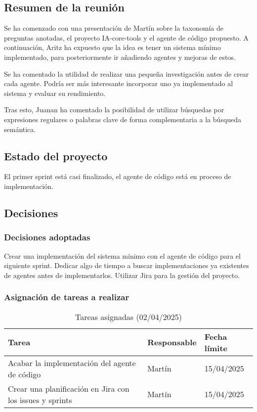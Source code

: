 \subsection{Resumen de la reunión}
Se ha comenzado con una presentación de Martín sobre la taxonomía de preguntas anotadas, el proyecto IA-core-tools y el agente de código propuesto. A continuación, Aritz ha expuesto que la idea es tener un sistema mínimo implementado, para posteriormente ir añadiendo agentes y mejoras de estos.

Se ha comentado la utilidad de realizar una pequeña investigación antes de crear cada agente. Podría ser más interesante incorporar uno ya implementado al sistema y evaluar su rendimiento.

Tras esto, Juanan ha comentado la posibilidad de utilizar búsquedas por expresiones regulares o palabras clave de forma complementaria a la búsqueda semántica.

\subsection{Estado del proyecto}
El primer sprint está casi finalizado, el agente de código está en proceso de implementación.

\subsection{Decisiones}
\subsubsection{Decisiones adoptadas}
Crear una implementación del sistema mínimo con el agente de código para el siguiente sprint.
Dedicar algo de tiempo a buscar implementaciones ya existentes de agentes antes de implementarlos.
Utilizar Jira para la gestión del proyecto.

\subsubsection{Asignación de tareas a realizar}
\begin{table}[h]
    \centering
    \begin{tabular}{|p{8cm}|p{3cm}|p{3cm}|}
        \hline
        \textbf{Tarea} & \textbf{Responsable} & \textbf{Fecha límite} \\
        \hline
        Acabar la implementación del agente de código & Martín & 15/04/2025 \\
        \hline
        Crear una planificación en Jira con los issues y sprints & Martín & 15/04/2025 \\
        \hline
    \end{tabular}
    \caption{Tareas asignadas (02/04/2025)}
\end{table}

